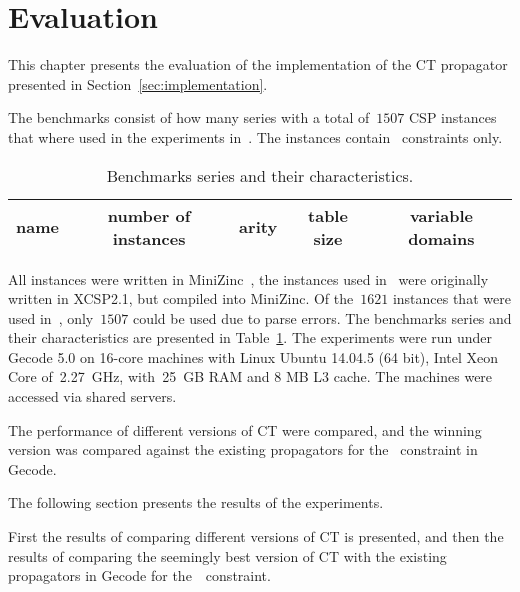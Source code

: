 \documentclass[a4paper,11pt]{article}
\newcommand{\Todo}[1]{{\color{blue}#1}}
\newcommand{\Chapref}[1]{Section~\ref{#1}}
\newcommand{\Table}{\Constraint{Table}}
\newcommand{\CTpaper}[0]{DBLP:conf/cp/DemeulenaereHLP16}
\numberwithin{equation}{section}
\begin{document}
\section{Evaluation}
\label{evaluation}

This chapter presents the evaluation of the implementation of the CT propagator
presented in \Chapref{sec:implementation}. 

\label{evaluation:setup}

The benchmarks consist of \Todo{how many} series 
with a total of~$1507$ CSP instances that where used in the
experiments in~\cite{\CTpaper}. The instances contain \Table~constraints
only.


  \begin{table}[h]%
    \caption{Benchmarks series and their characteristics.}
    \label{tab:benchmarks}
    
    \begin{sideways}
      \centering
      \begin{tabular}{lcccc}  %
        name & number of instances & arity & table size & variable domains \\
        \midrule
         
      \end{tabular}
    \end{sideways}
    \end{table}

\clearpage

All instances were written in MiniZinc~\cite{MiniZinc}, the
instances used in~\cite{\CTpaper} were originally written in XCSP2.1,
but compiled into MiniZinc. Of the~$1621$ instances that were used in~\cite{\CTpaper},
only~$1507$ could be used due to parse errors.
The benchmarks series and their characteristics are presented in Table~\ref{tab:benchmarks}.
The experiments were run
under Gecode 5.0 on 16-core machines with Linux Ubuntu 14.04.5 (64 bit),
Intel Xeon Core of~2.27~GHz, with~25~GB RAM and 8 MB L3 cache. The machines
were accessed via shared servers.

The performance of different versions of CT were compared, and the winning
version was compared against the existing propagators for
the \Table~constraint in Gecode.

The following section presents the results of the experiments.

First the results of comparing different versions of CT is presented,
and then the results of comparing the seemingly best version of CT with 
the existing propagators in Gecode for the~\Table~constraint.
\end{document}
